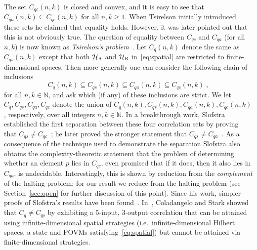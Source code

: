 \documentclass[11pt]{article}
\theoremstyle{definition}
\newcommand{\N}{\ensuremath{\mathbb{N}}}
\newcommand{\mH}{\ensuremath{\mathcal{H}}}
\newcommand{\labelstyle}[1]{\ensuremath{\textsc{#1}}\xspace}
\newcommand{\alice}{\labelstyle{A}}
\newcommand{\bob}{\labelstyle{B}}
\begin{document}
The set $C_{qc}(n,k)$ is closed and convex, and it is easy to see that $C_{qa}(n,k)\subseteq C_{qc}(n,k)$ for all $n,k\geq 1$. When Tsirelson initially introduced these sets he claimed that equality holds. However, it was later pointed out that this is not obviously true. The question of equality between $C_{qc}$ and $C_{qa}$ (for all $n,k$) is now known as \emph{Tsirelson's problem}~\cite{Tsi06}. Let $	C_q(n,k) $ denote the same as $C_{qs}(n,k)$ except that both $\mH_\alice$ and $\mH_{\bob}$ in~\eqref{eq:spatial} are restricted to finite-dimensional spaces. Then more generally one can consider the following chain of inclusions
\begin{equation}
\label{eq:corr-sets-chain}
	C_q(n,k) \subseteq C_{qs}(n,k) \subseteq C_{qa}(n,k) \subseteq C_{qc}(n,k)\;,
\end{equation}
for all $n,k \in \N$, and ask which (if any) of these inclusions are strict. We let $C_q,C_{qs},C_{qa},C_{qc}$ denote the union of $C_q(n,k),C_{qs}(n,k),C_{qa}(n,k),C_{qc}(n,k)$, respectively, over all integers $n,k \in \N$. 
In a breakthrough work, Slofstra established the first separation between these four correlation sets by proving that $C_{qs} \neq C_{qc}$~\cite{slofstra2019tsirelson}; he later proved the stronger statement that $C_{qs} \neq C_{qa}$~\cite{slofstra2019set}. As a consequence of the technique used to demonstrate the separation Slofstra also obtains the complexity-theoretic statement that the problem of determining whether an element $p$ lies in $C_{qc}$, even promised that if it does, then it also lies in $C_{qa}$, is undecidable. Interestingly, this is shown by reduction from the \emph{complement} of the halting problem; for our result we reduce from the halting problem (see Section~\ref{sec:open} for further discussion of this point). 
Since his work, simpler proofs of Slofstra's results have been found~\cite{dykema2019non,musat2018non,coladangelo2019two}. In~\cite{coladangelo2018unconditional}, Coladangelo and Stark showed that $C_{q} \neq C_{qs}$ by exhibiting a $5$-input, $3$-output correlation that can be attained using infinite-dimensional spatial strategies (i.e.\ infinite-dimensional Hilbert spaces, a state and POVMs satisfying~\eqref{eq:spatial}) but cannot be attained via finite-dimensional strategies.
\end{document}
